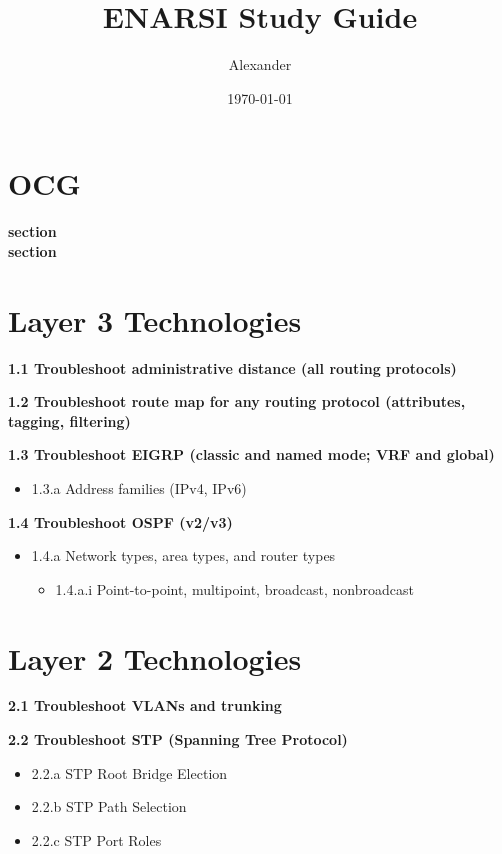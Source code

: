 \documentclass{article}
\title{ENARSI Study Guide}
\author{Alexander}
\date{\today}
\begin{document}
\maketitle

\section*{OCG}

\noindent\textbf{section}\\

\noindent\textbf{section}\\

\newpage
\section{Layer 3 Technologies}

\noindent\textbf{1.1 Troubleshoot administrative distance (all routing protocols)}

\noindent\textbf{1.2 Troubleshoot route map for any routing protocol (attributes, tagging, filtering)}

\noindent\textbf{1.3 Troubleshoot EIGRP (classic and named mode; VRF and global)}
\begin{itemize}
    \item 1.3.a Address families (IPv4, IPv6)
\end{itemize}

\noindent\textbf{1.4 Troubleshoot OSPF (v2/v3)}
\begin{itemize}
    \item 1.4.a Network types, area types, and router types
    \begin{itemize}
        \item 1.4.a.i Point-to-point, multipoint, broadcast, nonbroadcast
    \end{itemize}
\end{itemize}

\section{Layer 2 Technologies}

\noindent\textbf{2.1 Troubleshoot VLANs and trunking}

\noindent\textbf{2.2 Troubleshoot STP (Spanning Tree Protocol)}
\begin{itemize}
    \item 2.2.a STP Root Bridge Election
    \item 2.2.b STP Path Selection
    \item 2.2.c STP Port Roles
\end{itemize}
\end{document}
